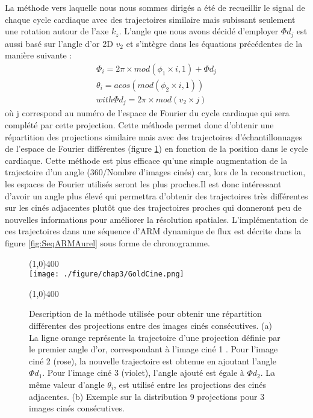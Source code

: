 La méthode vers laquelle nous nous sommes dirigés a été de recueillir le signal de chaque cycle cardiaque avec des trajectoires similaire mais subissant seulement une rotation autour de l'axe $k_z$. L'angle que nous avons décidé d'employer $\Phi d_j$ est aussi basé sur l'angle d'or 2D $v_2$ et s'intègre dans les équations précédentes de la manière suivante :
\begin{equation}
\begin{array}{c}
\Phi_i=2\pi \times mod(\phi_1 \times i,1) +\Phi d_j\\
\theta_i=acos(mod(\phi_2 \times i,1)) \\
with \Phi d_j=2\pi \times  mod( v_2 \times j)
\end{array}
\end{equation}
où j correspond au numéro de l'espace de Fourier du cycle cardiaque qui sera complété par cette projection. Cette méthode permet donc d'obtenir une répartition des projections similaire mais avec des trajectoires d'échantillonnages de l'espace de Fourier différentes (figure \ref{fig:GoldCine}) en fonction de la position dans le cycle cardiaque. Cette méthode est plus efficace qu'une simple augmentation de la trajectoire d'un angle (360/Nombre d'images cinés) car, lors de la reconstruction, les espaces de Fourier utilisés seront les plus proches.Il est donc intéressant d'avoir un angle plus élevé qui permettra d'obtenir des trajectoires très différentes sur les cinés adjacentes plutôt que des trajectoires proches qui donneront peu de nouvelles informations pour améliorer la résolution spatiales. 
L'implémentation de ces trajectoires dans une séquence d'ARM dynamique de flux est décrite dans la figure \ref{fig:SeqARMAurel} sous forme de chronogramme. 
\begin{figure}[H]
\centering \line(1,0){400} \\
\texttt{[image: ./figure/chap3/GoldCine.png]}
\caption[Répartition grâce à l'angle d'or entre les images ciné]{\label{fig:GoldCine} Description de la méthode utilisée pour obtenir une répartition différentes des projections entre des images cinés consécutives. (a) La ligne orange représente la trajectoire d'une projection définie par le premier angle d'or, correspondant à l'image ciné 1 . Pour l'image ciné 2 (rose), la nouvelle trajectoire est obtenue en ajoutant l'angle $\Phi d_1$. Pour l'image ciné 3 (violet), l'angle ajouté est égale à $\Phi d_2$. La même valeur d'angle $\theta_i$, est utilisé entre les projections des cinés adjacentes. (b) Exemple sur la distribution 9 projections pour 3 images cinés consécutives.}
\line(1,0){400} \\ \end{figure}

